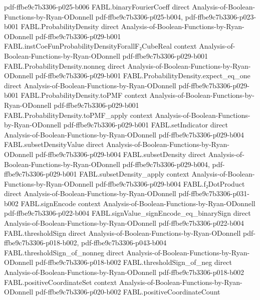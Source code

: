 \begin{theorem}
  {pdf-ffbe9c7b3306-p025-b006}
\proofstep
  {FABL.binaryFourierCoeff}
  {direct}
  {Analysis-of-Boolean-Functions-by-Ryan-ODonnell}
  {pdf-ffbe9c7b3306-p025-b004,
    pdf-ffbe9c7b3306-p023-b001}
\proofstep
  {FABL.ProbabilityDensity}
  {direct}
  {Analysis-of-Boolean-Functions-by-Ryan-ODonnell}
  {pdf-ffbe9c7b3306-p029-b001}
\proofstep
  {FABL.instCoeFunProbabilityDensityForallF₂CubeReal}
  {context}
  {Analysis-of-Boolean-Functions-by-Ryan-ODonnell}
  {pdf-ffbe9c7b3306-p029-b001}
\proofstep
  {FABL.ProbabilityDensity.nonneg}
  {direct}
  {Analysis-of-Boolean-Functions-by-Ryan-ODonnell}
  {pdf-ffbe9c7b3306-p029-b001}
\proofstep
  {FABL.ProbabilityDensity.expect_eq_one}
  {direct}
  {Analysis-of-Boolean-Functions-by-Ryan-ODonnell}
  {pdf-ffbe9c7b3306-p029-b001}
\proofstep
  {FABL.ProbabilityDensity.toPMF}
  {context}
  {Analysis-of-Boolean-Functions-by-Ryan-ODonnell}
  {pdf-ffbe9c7b3306-p029-b001}
\proofstep
  {FABL.ProbabilityDensity.toPMF_apply}
  {context}
  {Analysis-of-Boolean-Functions-by-Ryan-ODonnell}
  {pdf-ffbe9c7b3306-p029-b001}
\proofstep
  {FABL.setIndicator}
  {direct}
  {Analysis-of-Boolean-Functions-by-Ryan-ODonnell}
  {pdf-ffbe9c7b3306-p029-b004}
\proofstep
  {FABL.subsetDensityValue}
  {direct}
  {Analysis-of-Boolean-Functions-by-Ryan-ODonnell}
  {pdf-ffbe9c7b3306-p029-b004}
\proofstep
  {FABL.subsetDensity}
  {direct}
  {Analysis-of-Boolean-Functions-by-Ryan-ODonnell}
  {pdf-ffbe9c7b3306-p029-b004,
    pdf-ffbe9c7b3306-p029-b001}
\proofstep
  {FABL.subsetDensity_apply}
  {context}
  {Analysis-of-Boolean-Functions-by-Ryan-ODonnell}
  {pdf-ffbe9c7b3306-p029-b004}
\proofstep
  {FABL.f₂DotProduct}
  {direct}
  {Analysis-of-Boolean-Functions-by-Ryan-ODonnell}
  {pdf-ffbe9c7b3306-p031-b002}
\proofstep
  {FABL.signEncode}
  {context}
  {Analysis-of-Boolean-Functions-by-Ryan-ODonnell}
  {pdf-ffbe9c7b3306-p022-b004}
\proofstep
  {FABL.signValue_signEncode_eq_binarySign}
  {direct}
  {Analysis-of-Boolean-Functions-by-Ryan-ODonnell}
  {pdf-ffbe9c7b3306-p022-b004}
\proofstep
  {FABL.thresholdSign}
  {direct}
  {Analysis-of-Boolean-Functions-by-Ryan-ODonnell}
  {pdf-ffbe9c7b3306-p018-b002,
    pdf-ffbe9c7b3306-p043-b004}
\proofstep
  {FABL.thresholdSign_of_nonneg}
  {direct}
  {Analysis-of-Boolean-Functions-by-Ryan-ODonnell}
  {pdf-ffbe9c7b3306-p018-b002}
\proofstep
  {FABL.thresholdSign_of_neg}
  {direct}
  {Analysis-of-Boolean-Functions-by-Ryan-ODonnell}
  {pdf-ffbe9c7b3306-p018-b002}
\proofstep
  {FABL.positiveCoordinateSet}
  {context}
  {Analysis-of-Boolean-Functions-by-Ryan-ODonnell}
  {pdf-ffbe9c7b3306-p020-b002}
\proofstep
  {FABL.positiveCoordinateCount}

\end{theorem}
